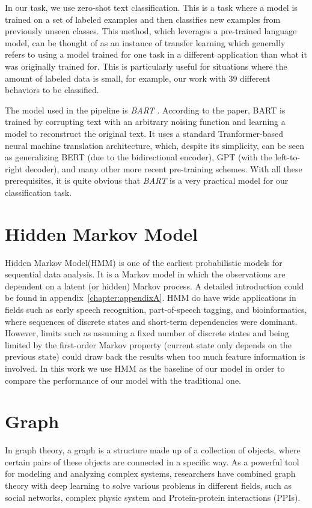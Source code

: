 In our task, we use zero-shot text classification. This is a task where a model is trained on a set of labeled examples and then classifies new examples from previously unseen classes. This method, which leverages a pre-trained language model, can be thought of as an instance of transfer learning which generally refers to using a model trained for one task in a different application than what it was originally trained for. This is particularly useful for situations where the amount of labeled data is small, for example, our work with 39 different behaviors to be classified.

The model used in the pipeline is \textit{BART} \cite{lewis2019bartdenoisingsequencetosequencepretraining}. According to the paper, BART is trained by corrupting text with an arbitrary noising function and learning a model to reconstruct the original text. It uses a standard Tranformer-based neural machine translation architecture, which, despite its simplicity, can be seen as generalizing BERT (due to the bidirectional encoder), GPT (with the left-to-right decoder), and many other more recent pre-training schemes. With all these prerequisites, it is quite obvious that \textit{BART} is a very practical model for our classification task.



\section{Hidden Markov Model}
Hidden Markov Model(HMM) \cite{rabiner1989tutorial,baum1972inequality} is one of the earliest probabilistic models for sequential data analysis. It is a Markov model in which the observations are dependent on a latent (or hidden) Markov process. A detailed introduction could be found in appendix~\ref{chapter:appendixA}. HMM do have wide applications in fields such as early speech recognition, part-of-speech tagging, and bioinformatics, where sequences of discrete states and short-term dependencies were dominant. However, limits such as assuming a fixed number of discrete states and being limited by the first-order Markov property (current state only depends on the previous state) could draw back the results when too much feature information is involved. In this work we use HMM as the baseline of our model in order to compare the performance of our model with the traditional one.
\section{Graph}
\label{sec:graph}
In graph theory, a graph is a structure made up of a collection of objects, where certain pairs of these objects are connected in a specific way\cite{zhou2020graph}. As a powerful tool for modeling and analyzing complex systems, researchers have combined graph theory with deep learning to solve various problems in different fields, such as social networks\cite{wu2020graph}, complex physic system\cite{sanchez2018graph} and Protein-protein interactions (PPIs)\cite{NIPS2017_f5077839}.

